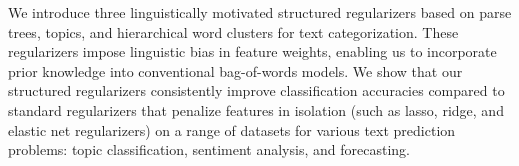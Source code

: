 We introduce three linguistically motivated structured regularizers based on parse trees, topics, and hierarchical word clusters for text categorization. These regularizers impose linguistic bias in feature weights, enabling us to incorporate prior knowledge into conventional bag-of-words models. We show that our structured regularizers consistently improve classification accuracies compared to standard regularizers that penalize features in isolation (such as lasso, ridge, and elastic net regularizers) on a range of datasets for various text prediction problems: topic classification, sentiment analysis, and forecasting.
